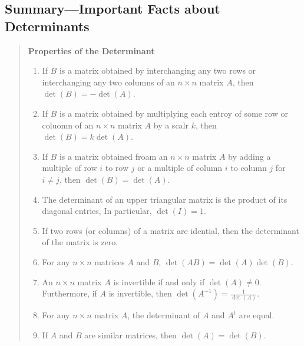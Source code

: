 \subsection{Summary---Important Facts about Determinants}
\begin{quotation}{\textbf{Properties of the Determinant}}
    \begin{enumerate}
        \item If \(B \) is a matrix obtained by interchanging any two rows or interchanging any two columns of an \( n \times n \) matrix \( A \), then \( \det(B) = - \det(A) \).
        \item If \(B\) is a matrix obtained by multiplying each entroy of some row or coluomn of an \(n \times n \) matrix \(A\) by a scalr \(k\), then \(\det(B) = k \det(A)\).
        \item If \(B\) is a matrix obtained froam an \(n \times n \) matrix \(A\) by adding a multiple of row \(i\) to row \(j\) or a multiple of column \(i\) to column \(j\) for \(i \neq j\), then \(\det(B) = \det(A)\).
        \item The determinant of an upper triangular matrix is the product of its diagonal entries, In particular, \(\det(I) = 1\).
        \item If two rows (or columns) of a matrix are idential, then the determinant of the matrix is zero.
        \item For any \(n \times n \) matrices \(A \) and \(B\), \(\det(AB) = \det(A) \det(B)\).
        \item An \(n \times n\) matrix \(A\) is invertible if and only if \(\det(A) \neq 0 \). Furthermore, if \(A\) is invertible, then \(\det(A^{-1}) = \frac{1}{\det(A)}\).
        \item For any \(n \times n \) matrix \(A\), the determinant of \(A\) and \(A^t\) are equal.
        \item If \(A\) and \(B\) are similar matrices, then \(\det(A) = \det(B)\).
    \end{enumerate}
\end{quotation}